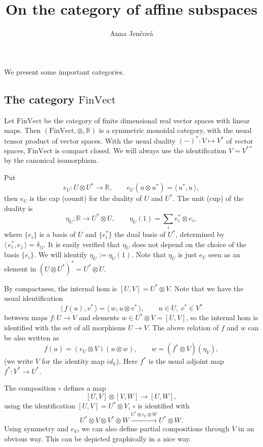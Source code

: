 \documentclass[12pt]{article}
\title{On the category of affine subspaces}
\author{Anna Jen\v cov\'a}
\theoremstyle{definition}
\theoremstyle{remark}
\def\<{\langle\,}
\def\>{\,\rangle}
\def \FV{\mathrm{FinVect}}
\begin{document}
\maketitle

We present some important categories.

\subsection{The category $\FV$}

Let  $\FV$ be the category of finite dimensional real vector spaces with linear maps. Then
$(\FV,\otimes, \mathbb R)$ is a symmetric monoidal category, with the usual tensor product
of vector spaces. With the usual duality $(-)^*: V\mapsto V^*$  of vector spaces, $\FV$ is
compact closed.  We will always use the identification $V=V^{**}$ by the canonical
isomorphism.

Put
\[
e_U: U\otimes U^*\to \mathbb R,\qquad e_U(u\otimes u^*)=\<u^*,u\>,
\]
then $e_U$ is the cap (counit) for the duality of $U$ and $U^*$. The unit (cup) of the
duality is 
\[
\eta_U: \mathbb R\to U^*\otimes U, \qquad \eta_U(1)=\sum_i e_i^*\otimes e_i,
\]
where $\{e_i\}$ is a basis of $U$ and $\{e_i^*\}$ the dual basis of $U^*$, determined by
$\<e_i^*,e_j\>=\delta_{ij}$. It is easily verified that $\eta_U$ does not depend on the
choice of the basis $\{e_i\}$. We will identify $\eta_U:=\eta_U(1)$. Note that $\eta_U$ is
just $e_U$ seen as an element in $(U\otimes U^*)^*=U^*\otimes U$.

By compactness, the internal hom is  $[U,V]=U^*\otimes V$. Note that we have the usual identification 
\begin{equation}\label{eq:fvhoms}
\<f(u),v^*\>=\<w,u\otimes v^*\>,\qquad u\in U,\
v^*\in V^*
\end{equation}
between maps $f:U\to V$ and elements $w\in U^*\otimes V=[U,V]$, so the internal hom is
identified with  the set of all morphisms $U\to V$.  The above relation of $f$ and $w$ can be also
written as
\[
f(u)=(e_U\otimes V)(u\otimes w),\qquad 
w=(f^*\otimes V)(\eta_V),
\]
(we write $V$ for the identity map  $id_V$). Here $f^*$ is the usual adjoint map
$f^*:V^*\to U^*$.  

The composition $\circ$ defines a map
\[
[U,V]\otimes [V,W]\to [U,W],
\]
using the identification $[U,V]=U^*\otimes V$, $\circ$ is identified with 
\[
U^*\otimes V\otimes V^*\otimes W\xrightarrow{U^*\otimes e_V\otimes W} U^*\otimes W.
\]
Using symmetry and $e_V$, we can also define partial compositions through $V$ in an obvious way.
This can be depicted graphically in a nice way.
\end{document}
